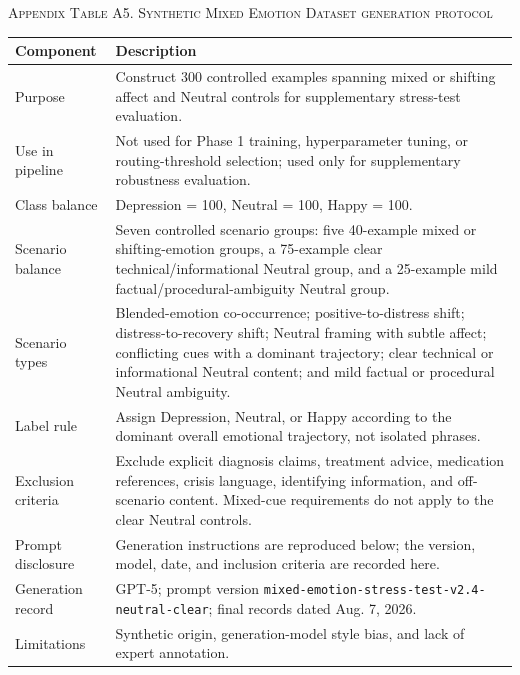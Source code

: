 \documentclass{ieeeaccess}
\begin{document}
\par\medskip
\noindent\textsc{Appendix Table A5. Synthetic Mixed Emotion Dataset generation protocol}\par
\label{tab:appendix-a5-mixed-emotion-protocol}
\smallskip
\footnotesize
\setlength{\tabcolsep}{4pt}
\renewcommand{\arraystretch}{1.08}
\noindent\begin{tabularx}{\textwidth}{@{}>{\raggedright\arraybackslash}p{}Y@{}}
\toprule
Component & Description \\
\midrule
Purpose & Construct 300 controlled examples spanning mixed or shifting affect and Neutral controls for supplementary stress-test evaluation. \\
Use in pipeline & Not used for Phase 1 training, hyperparameter tuning, or routing-threshold selection; used only for supplementary robustness evaluation. \\
Class balance & Depression = 100, Neutral = 100, Happy = 100. \\
Scenario balance & Seven controlled scenario groups: five 40-example mixed or shifting-emotion groups, a 75-example clear technical/informational Neutral group, and a 25-example mild factual/procedural-ambiguity Neutral group. \\
Scenario types & Blended-emotion co-occurrence; positive-to-distress shift; distress-to-recovery shift; Neutral framing with subtle affect; conflicting cues with a dominant trajectory; clear technical or informational Neutral content; and mild factual or procedural Neutral ambiguity. \\
Label rule & Assign Depression, Neutral, or Happy according to the dominant overall emotional trajectory, not isolated phrases. \\
Exclusion criteria & Exclude explicit diagnosis claims, treatment advice, medication references, crisis language, identifying information, and off-scenario content. Mixed-cue requirements do not apply to the clear Neutral controls. \\
Prompt disclosure & Generation instructions are reproduced below; the version, model, date, and inclusion criteria are recorded here. \\
Generation record & GPT-5; prompt version \texttt{mixed-emotion-stress-test-v2.4-neutral-clear}; final records dated Aug. 7, 2026. \\
Limitations & Synthetic origin, generation-model style bias, and lack of expert annotation. \\
\bottomrule
\end{tabularx}
\par\medskip
\end{document}
